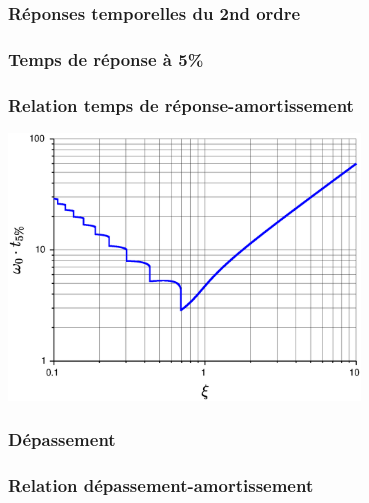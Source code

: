 \documentclass[10pt]{beamer}
\begin{document}
\begin{frame}
    \frametitle{Réponses temporelles du 2nd ordre}
    
\end{frame}
\begin{frame}[fragile]
    \frametitle{Temps de réponse à 5\%}
\begin{center}
    
\end{center}
\end{frame}
\begin{frame}
    \frametitle{Relation temps de réponse-amortissement}
    \centering
    \includegraphics[width=0.7\textwidth]{fig/fig_temps_de_reduit.eps}
\end{frame}
\begin{frame}[fragile]
    \frametitle{Dépassement}
\begin{center}
    
\end{center}                                                                                                     
\end{frame}           
\begin{frame}[fragile]
    \frametitle{Relation dépassement-amortissement}
\begin{center}

\end{center}
\end{frame}
\end{document}
